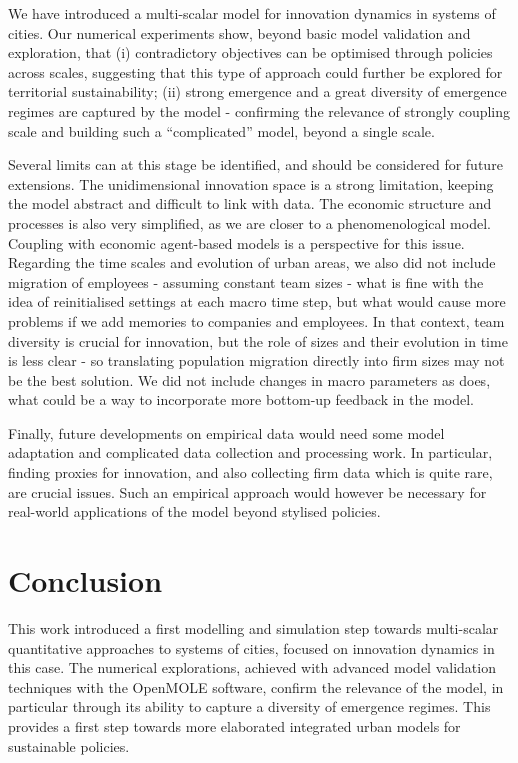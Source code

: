 \documentclass[letterpaper]{article}
\begin{document}
We have introduced a multi-scalar model for innovation dynamics in systems of cities. Our numerical experiments show, beyond basic model validation and exploration, that (i) contradictory objectives can be optimised through policies across scales, suggesting that this type of approach could further be explored for territorial sustainability; (ii) strong emergence and a great diversity of emergence regimes are captured by the model - confirming the relevance of strongly coupling scale and building such a ``complicated'' model, beyond a single scale.

Several limits can at this stage be identified, and should be considered for future extensions. The unidimensional innovation space is a strong limitation, keeping the model abstract and difficult to link with data. The economic structure and processes is also very simplified, as we are closer to a phenomenological model. Coupling with economic agent-based models is a perspective for this issue. Regarding the time scales and evolution of urban areas, we also did not include migration of employees - assuming constant team sizes - what is fine with the idea of reinitialised settings at each macro time step, but what would cause more problems if we add memories to companies and employees. In that context, team diversity is crucial for innovation, but the role of sizes and their evolution in time is less clear \citep{hoisl2017r} - so translating population migration directly into firm sizes may not be the best solution. We did not include changes in macro parameters as \cite{raimbault2021strong} does, what could be a way to incorporate more bottom-up feedback in the model.

Finally, future developments on empirical data would need some model adaptation and complicated data collection and processing work. In particular, finding proxies for innovation, and also collecting firm data which is quite rare, are crucial issues. Such an empirical approach would however be necessary for real-world applications of the model beyond stylised policies.

\section{Conclusion}

This work introduced a first modelling and simulation step towards multi-scalar quantitative approaches to systems of cities, focused on innovation dynamics in this case. The numerical explorations, achieved with advanced model validation techniques with the OpenMOLE software, confirm the relevance of the model, in particular through its ability to capture a diversity of emergence regimes. This provides a first step towards more elaborated integrated urban models for sustainable policies.



\footnotesize


\end{document}
